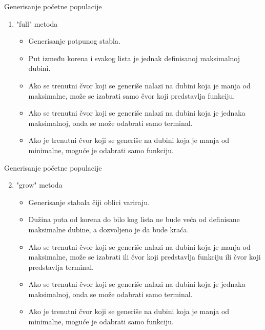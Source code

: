 \documentclass{beamer}
\begin{document}
\begin{frame}{Generisanje početne populacije}
\begin{enumerate}
    \item "full" metoda
        \begin{itemize}
            \small 
            \item Generisanje potpunog stabla.
            \item Put između korena i svakog lista je jednak definisanoj maksimalnoj dubini.
            \item Ako se trenutni čvor koji se generiše nalazi na dubini koja je manja od maksimalne, može se izabrati samo čvor koji predstavlja funkciju.
            \item Ako se trenutni čvor koji se generiše nalazi na dubini koja je jednaka maksimalnoj, onda se može odabrati samo terminal.
            \item Ako je trenutni čvor koji se generiše na dubini koja je manja od minimalne, moguće je odabrati samo funkciju.
        \end{itemize}
    
\end{enumerate}
\end{frame}


\begin{frame}{Generisanje početne populacije}
\begin{enumerate}
\setcounter{enumi}{1}
    \item "grow" metoda
        \begin{itemize}
            \item Generisanje stabala čiji oblici variraju.
            \item Dužina puta od korena do bilo kog lista ne bude veća od definisane maksimalne dubine, a dozvoljeno je da bude kraća.
            \item Ako se trenutni čvor koji se generiše nalazi na dubini koja je manja od maksimalne, može se izabrati ili čvor koji predstavlja funkciju ili čvor koji predstavlja terminal.
            \item Ako se trenutni čvor koji se generiše nalazi na dubini koja je jednaka maksimalnoj, onda se može odabrati samo terminal. 
            \item Ako je trenutni čvor koji se generiše na dubini koja je manja od minimalne, moguće je odabrati samo funkciju.
        \end{itemize}
\end{enumerate}
\end{frame}
\end{document}
